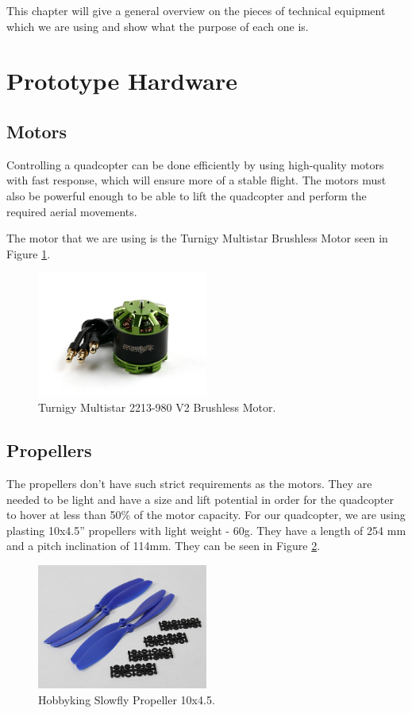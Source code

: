 This chapter will give a general overview on the pieces of technical equipment which we are using and show what the purpose of each one is.

\section{Prototype Hardware}

\subsection{Motors}
Controlling a quadcopter can be done efficiently by using high-quality motors with fast response, which will ensure more of a stable flight. The motors must also be powerful enough to be able to lift the quadcopter and perform the required aerial movements. 

The motor that we are using is the Turnigy Multistar Brushless Motor seen in Figure \ref{motor}.

\begin{figure}[H]
  \centering
    \includegraphics[width=0.5\textwidth]{images/motor.jpg}
	\caption{Turnigy Multistar 2213-980 V2 Brushless Motor.}
	\label{motor}
\end{figure}

\subsection{Propellers}
The propellers don't have such strict requirements as the motors. They are needed to be light and have a size and lift potential in order for the quadcopter to hover at less than 50\% of the motor capacity. For our quadcopter, we are using plasting 10x4.5'' propellers with light weight - 60g. They have a length of 254 mm and a pitch inclination of 114mm. They can be seen in Figure \ref{propeller}.

\begin{figure}[H]
  \centering
    \includegraphics[width=0.5\textwidth]{images/propeller.jpg}
	\caption{Hobbyking Slowfly Propeller 10x4.5.}
	\label{propeller}
\end{figure}

